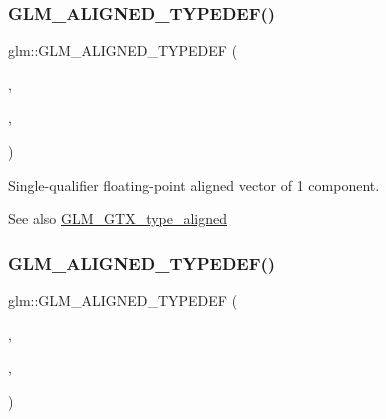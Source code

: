 \subsubsection{\texorpdfstring{G\+L\+M\+\_\+\+A\+L\+I\+G\+N\+E\+D\+\_\+\+T\+Y\+P\+E\+D\+E\+F()}{GLM\_ALIGNED\_TYPEDEF()}\hspace{0.1cm}{\footnotesize\ttfamily [147/209]}}
{\footnotesize\ttfamily glm\+::\+G\+L\+M\+\_\+\+A\+L\+I\+G\+N\+E\+D\+\_\+\+T\+Y\+P\+E\+D\+EF (\begin{DoxyParamCaption}\item[{\mbox{\hyperlink{group__gtc__type__precision_gaed54853d0f184df0e5fbd9f9118c477b}{fvec1}}}]{,  }\item[{aligned\+\_\+fvec1}]{,  }\item[{4}]{ }\end{DoxyParamCaption})}

Single-\/qualifier floating-\/point aligned vector of 1 component. \begin{DoxySeeAlso}{See also}
\mbox{\hyperlink{group__gtx__type__aligned}{G\+L\+M\+\_\+\+G\+T\+X\+\_\+type\+\_\+aligned}} 
\end{DoxySeeAlso}
\mbox{\label{group__gtx__type__aligned_ga2543c05ba19b3bd19d45b1227390c5b4}} 
\subsubsection{\texorpdfstring{G\+L\+M\+\_\+\+A\+L\+I\+G\+N\+E\+D\+\_\+\+T\+Y\+P\+E\+D\+E\+F()}{GLM\_ALIGNED\_TYPEDEF()}\hspace{0.1cm}{\footnotesize\ttfamily [148/209]}}
{\footnotesize\ttfamily glm\+::\+G\+L\+M\+\_\+\+A\+L\+I\+G\+N\+E\+D\+\_\+\+T\+Y\+P\+E\+D\+EF (\begin{DoxyParamCaption}\item[{\mbox{\hyperlink{group__gtc__type__precision_gaabc3d7a259968a12108c052ff9265148}{fvec2}}}]{,  }\item[{aligned\+\_\+fvec2}]{,  }\item[{8}]{ }\end{DoxyParamCaption})}

